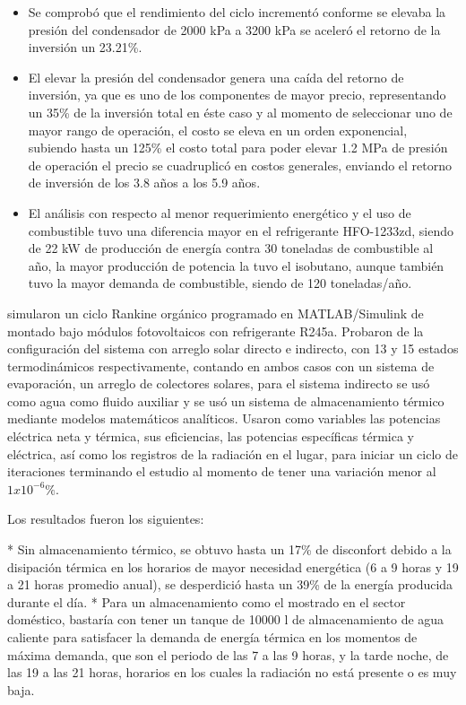 \begin{itemize}
    \item Se comprobó que el rendimiento del ciclo incrementó conforme se elevaba la presión del condensador de 2000 kPa a 3200 kPa se aceleró el retorno de la inversión un 23.21\%.
    \item El elevar la presión del condensador genera una caída del retorno de inversión, ya que es uno de los componentes de mayor precio, representando un 35\% de la inversión total en éste caso y al momento de seleccionar uno de mayor rango de operación, el costo se eleva en un orden exponencial, subiendo hasta un 125\% el costo total para poder elevar 1.2 MPa de presión de operación el precio se cuadruplicó en costos generales, enviando el retorno de inversión de los 3.8 años a los 5.9 años.
    \item El análisis con respecto al menor requerimiento energético y el uso de combustible tuvo una diferencia mayor en el refrigerante HFO-1233zd, siendo de 22 kW de producción de energía contra 30 toneladas de combustible al año, la mayor producción de potencia la tuvo el isobutano, aunque también tuvo la mayor demanda de combustible, siendo de 120 toneladas/año.
\end{itemize}


\textcite{ALVI2020114780} simularon un ciclo Rankine orgánico programado en MATLAB/Simulink de montado bajo módulos fotovoltaicos con refrigerante R245a. Probaron de la configuración del sistema con arreglo solar directo e indirecto, con 13 y 15 estados termodinámicos respectivamente, contando en ambos casos con un sistema de evaporación, un arreglo de colectores solares, para el sistema indirecto se usó como agua como fluido auxiliar y se usó un sistema de almacenamiento térmico mediante modelos matemáticos analíticos. Usaron como variables las potencias eléctrica neta y térmica, sus eficiencias, las potencias específicas térmica y eléctrica, así como los registros de la radiación en el lugar, para iniciar un ciclo de iteraciones terminando el estudio al momento de tener una variación menor al $1x10^{-6}\%$.

Los resultados fueron los siguientes:

\begin{markdown}
* Sin almacenamiento térmico, se obtuvo hasta un 17\% de disconfort debido a la disipación térmica en los horarios de mayor necesidad energética (6 a 9 horas y 19 a 21 horas promedio anual), se desperdició hasta un 39\% de la energía producida durante el día.
* Para un almacenamiento como el mostrado en el sector doméstico, bastaría con tener un tanque de 10000 l de almacenamiento de agua caliente para satisfacer la demanda de energía térmica en los momentos de máxima demanda, que son el periodo de las 7 a las 9 horas, y la tarde noche, de las 19 a las 21 horas, horarios en los cuales la radiación no está presente o es muy baja.
\end{markdown}

